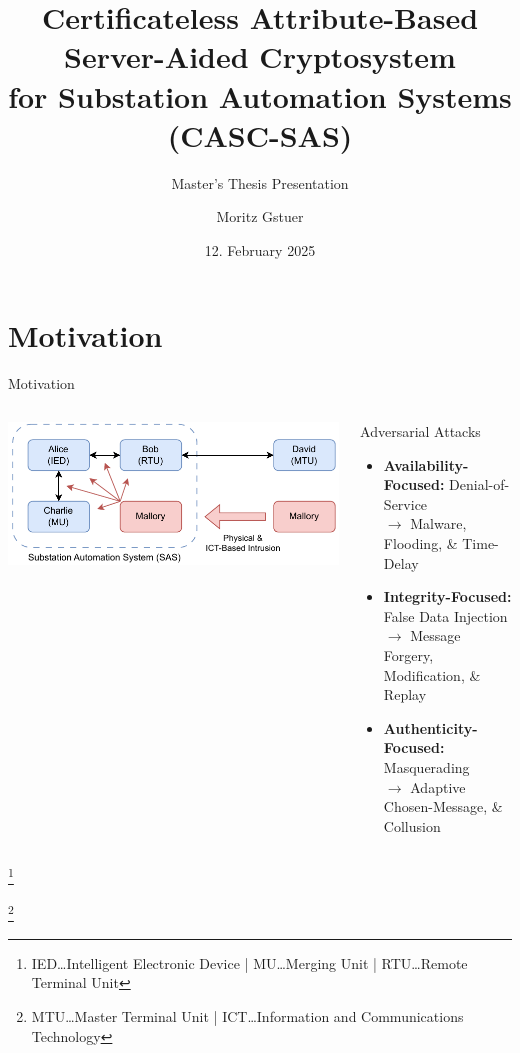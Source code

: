 \documentclass[en]{sdqbeamer}
\title[ABAC for Substations]{Certificateless Attribute-Based Server-Aided Cryptosystem\\for Substation Automation Systems (CASC-SAS)}
\subtitle{Master's Thesis Presentation}
\author[Moritz Gstuer]{Moritz Gstuer}
\date[12.\,02.\,2025]{12. February 2025}
\newcommand\nonumberfootnote[1]{%
  \begingroup
  \renewcommand\thefootnote{}\footnote{#1}%
  \addtocounter{footnote}{-1}%
  \endgroup
}
\begin{document}
 
\KITtitleframe


\section{Motivation}
\begin{frame}{Motivation}
    \begin{columns}
        \centering
        \includegraphics[width=1.0\textwidth]{./figures/sas_intrusion.drawio.pdf}
        \begin{redblock}{Adversarial Attacks}
            \begin{itemize}
                \item \textbf{Availability-Focused:} Denial-of-Service\\$\rightarrow$ Malware, Flooding, \& Time-Delay
                \item \textbf{Integrity-Focused:} False Data Injection\\$\rightarrow$ Message Forgery, Modification, \& Replay
                \item \textbf{Authenticity-Focused:} Masquerading\\$\rightarrow$ Adaptive Chosen-Message, \& Collusion
            \end{itemize}
        \end{redblock}
    \end{columns}
    \nonumberfootnote{IED\dots Intelligent Electronic Device | MU\dots Merging Unit | RTU\dots Remote Terminal Unit}
    \nonumberfootnote{MTU\dots Master Terminal Unit | ICT\dots Information and Communications Technology}
\end{frame}
\end{document}
